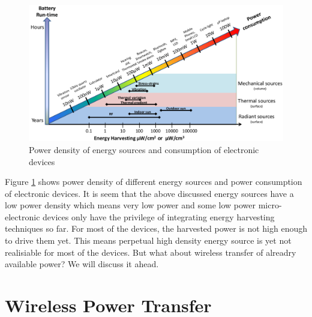 \documentclass[UKenglish]{ifimaster}  %
\begin{document}
\begin{figure}[H] %
   \centering
   \includegraphics[width=\textwidth]{img/power_density_2.png}
   \caption{Power density of energy sources and consumption of electronic devices \cite{power_density}}
   \label{fig:power_density}
\end{figure}

Figure \ref{fig:power_density} shows power density of different energy sources and power consumption of electronic 
devices. It is seem  that the above discussed energy sources have a low power density which means very low power 
and some low power micro-electronic devices only have the privilege of integrating energy harvesting techniques 
so far. For most of the devices, the harvested power is not high enough to drive them yet. This means perpetual 
high density energy source is yet not realisiable for most of the devices. But what about wireless transfer of 
alreadry available power? We will discuss it ahead. 


\section{Wireless Power Transfer}
\end{document}
